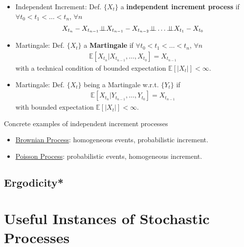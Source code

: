 \begin{itemize}[topsep=2pt,itemsep=0pt]
    \item Independent Increment: Def. $ \{X_t\} $ a \textbf{independent increment process} if $ \forall t_0<t_1<\ldots<t_n $, $ \forall n $
\begin{align}
    X_{t_{n}}-X_{t_{n-1}}\independent X_{t_{n-1}}-X_{t_{n-2}} \independent \ldots\independent X_{t_1}-X_{t_0}
\end{align}
    \item Martingale: Def. $ \{X_t\}  $ a \textbf{Martingale} if $ \forall t_0<t_1<\ldots<t_n $, $ \forall n $
    \begin{align}
        \mathbb{E}\left[ X_{t_n}|X_{t_{n-1}},\ldots,X_{t_0} \right] = X_{t_{n-1}} 
    \end{align}
    with a technical condition of bounded expectation $ \mathbb{E}\left[ |X_t| \right] <\infty $.
    \item Martingale: Def. $ \{X_t\}  $ being a Martingale w.r.t. $ \{Y_t\} $ if
    \begin{align}
        \mathbb{E}\left[ X_{t_n}|Y_{t_{n-1}},\ldots,Y_{t_0} \right] = X_{t_{n-1}} 
    \end{align}
    with bounded expectation $ \mathbb{E}\left[ |X_t| \right] <\infty $.

    
\end{itemize}

\begin{point}
    Concrete examples of independent increment processes
\end{point}

\begin{itemize}[topsep=2pt,itemsep=0pt]
    \item \hyperlink{BrownianProcess}{Brownian Process}: homogeneous events, probabilistic increment.
    \item \hyperlink{PoissonProcess}{Poisson Process}: probabilistic events, homogeneous increment.
\end{itemize}




\subsection{Ergodicity*}






\section{Useful Instances of Stochastic Processes}

